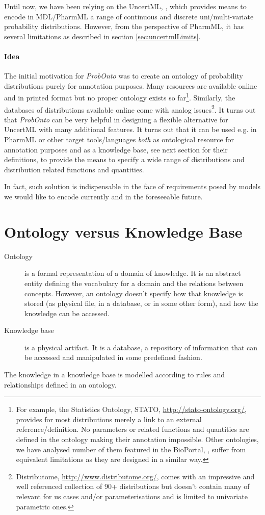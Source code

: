 Until now, we have been relying on the UncertML, \cite{uncertml3:2014}, 
which provides means to encode in MDL/PharmML a range of continuous and 
discrete uni/multi-variate probability distributions. However, from the perspective 
of PharmML, it has several limitations as described in section \ref{sec:uncertmlLimits}. 

\paragraph{Idea} The initial motivation for \emph{ProbOnto} was to create an ontology of probability 
distributions purely for annotation purposes. Many resources are available online 
and in printed format but no proper ontology exists so far\footnote{For 
example, the Statistics Ontology, STATO, \url{http://stato-ontology.org/}, provides 
for most distributions merely a link to an external reference/definition. No parameters
or related functions and quantities are defined in the ontology making their annotation
impossible. Other ontologies, we have analysed number of them featured in the 
BioPortal, \cite{noy2009bioportal}, suffer from equivalent limitations
as they are designed in a similar way.}.  
Similarly, the databases of distributions available online come with analog issues\footnote{Distributome, 
\url{http://www.distributome.org/}, comes with an impressive and well referenced collection
of 90+ distributions but doesn't contain many of relevant for us cases and/or 
parameterisations and is limited to univariate parametric ones.}.
It turns out that \emph{ProbOnto} can be very helpful in
designing a flexible alternative for UncertML with many additional features.
It turns out that it can be used e.g. in PharmML or other target tools/languages \emph{both} 
as ontological resource for annotation purposes and as a knowledge base, 
see next section for their definitions, to provide the means to specify a wide range 
of distributions and distribution related functions and quantities.

In fact, such solution is indispensable in the face of requirements 
posed by models we would like to encode currently and in the foreseeable future. 

\section{Ontology versus Knowledge Base}
\begin{description}
\item[Ontology] is a formal representation of a domain of knowledge. It is an abstract entity 
defining the vocabulary for a domain and the relations between concepts.
However, an ontology doesn't specify how that knowledge is stored 
(as physical file, in a database, or in some other form), and how the knowledge 
can be accessed.
\item[Knowledge base] is a physical artifact. It is a database, a repository of information 
that can be accessed and manipulated in some predefined fashion.
\end{description}
The knowledge in a knowledge base is modelled according to rules and relationships 
defined in an ontology.

